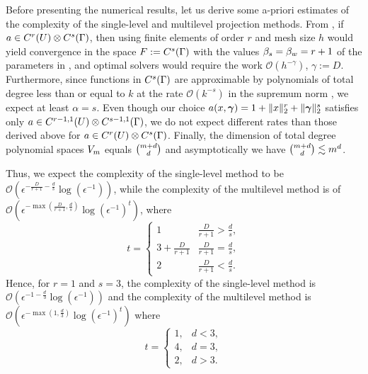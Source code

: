 Before presenting the numerical results, let us derive some a-priori
estimates of the complexity of the single-level and multilevel
projection methods.  From , if
$a \in C^{r}(U)\otimes C^{s}(\Gamma)$, then using finite elements
of order $r$ and mesh size $h$ would yield convergence in the space $F:=C^{s}(\Gamma)$ with the values $\beta_{s}=\beta_{w}=r+1$ of the parameters in , and  optimal solvers
would require the work $\mathcal{O}(h^{-\gamma})$,  $\gamma:=D$. Furthermore, since functions in
$C^{s}(\Gamma)$ are approximable by polynomials of total degree less than or equal to $k$ at the rate $\mathcal{O}(k^{-s})$ in the supremum norm \cite{BagbyBosLevenberg2002}, we expect at least $\alpha=s$.
Even though our choice $a(x,\bm{\gamma}) = 1 + \|  x\|_2^{r} + \| \bm{\gamma}\|_2^{s}$
satisfies only $a \in C^{r-1, 1}(U)\otimes C^{s-1,1}(\Gamma)$, we do not expect different rates than those derived above for $a\in C^{r}(U)\otimes C^{s}(\Gamma)$. Finally, the dimension of total degree polynomial spaces $V_{m}$ equals $\binom{m+d}{d}$ and asymptotically we have $\binom{m+d}{d}\lesssim m^d$.

Thus, we expect the complexity of the single-level method to be
$\mathcal{O}\left(\epsilon^{-\frac{D}{r+1} -
    \frac{d}{s}}\log(\epsilon^{-1})\right)$, while the complexity of
the multilevel method is of
$\mathcal{O}\left({\epsilon^{-\max\left({\frac{D}{r + 1},
          \frac{d}{s}}\right)}} \log(\epsilon^{-1})^{t}\right)$,
where
\[t =
  \begin{cases}
    1 & \frac{D}{r + 1} > \frac{d}{s},\\
    3 + \frac{D}{r+1} & \frac{D}{r + 1} = \frac{d}{s},\\
    2 & \frac{D}{r + 1} < \frac{d}{s}.
  \end{cases}
\]
Hence, for $r=1$ and $s=3$, the complexity of the single-level
method is
$\mathcal{O}\left(\epsilon^{-1 -
    \frac{d}{3}}\log(\epsilon^{-1})\right)$ and the complexity of the
multilevel method is
$\mathcal{O}\left({\epsilon^{-\max({1, \frac{d}{3}})}}
  \log(\epsilon^{-1})^{t}\right)$ where
\[t =
  \begin{cases}
    1, & d < 3,\\
    4, & d = 3,\\
    2, & d > 3.
  \end{cases}
\]

